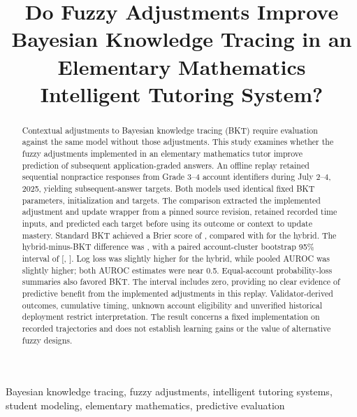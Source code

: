 \documentclass[conference]{IEEEtran}
\newif\ifworkingdraft
\newcommand{\draftnote}[1]{\ifworkingdraft\par\noindent\textcolor{red}{\textbf{Author review:} #1}\par\fi}
\begin{document}
\title{Do Fuzzy Adjustments Improve Bayesian Knowledge Tracing in an Elementary Mathematics Intelligent Tutoring System?}
\author{}
\maketitle
\draftnote{The approved offline comparison is complete and numerical results below are measured outputs. Before submission, complete the actual ethics reference, cohort/setting description and publication-overlap details; review the analysis and export the Mermaid figures.}

\begin{abstract}
Contextual adjustments to Bayesian knowledge tracing (BKT) require evaluation against the same model without those adjustments. This study examines whether the fuzzy adjustments implemented in an elementary mathematics tutor improve prediction of subsequent application-graded answers. An offline replay retained \CandidateResponseCount{} sequential nonpractice responses from \CandidateAccountCount{} Grade 3--4 account identifiers during July 2--4, 2025, yielding \ScoredTargets{} subsequent-answer targets. Both models used identical fixed BKT parameters, initialization and targets. The comparison extracted the implemented adjustment and update wrapper from a pinned source revision, retained recorded time inputs, and predicted each target before using its outcome or context to update mastery. Standard BKT achieved a Brier score of \BktBrier{}, compared with \HybridBrier{} for the hybrid. The hybrid-minus-BKT difference was \BrierDelta{}, with a paired account-cluster bootstrap 95\% interval of [\BrierCILower{}, \BrierCIUpper{}]. Log loss was slightly higher for the hybrid, while pooled AUROC was slightly higher; both AUROC estimates were near 0.5. Equal-account probability-loss summaries also favored BKT. The interval includes zero, providing no clear evidence of predictive benefit from the implemented adjustments in this replay. Validator-derived outcomes, cumulative timing, unknown account eligibility and unverified historical deployment restrict interpretation. The result concerns a fixed implementation on recorded trajectories and does not establish learning gains or the value of alternative fuzzy designs.
\end{abstract}
\begin{IEEEkeywords}
Bayesian knowledge tracing, fuzzy adjustments, intelligent tutoring systems, student modeling, elementary mathematics, predictive evaluation
\end{IEEEkeywords}
\end{document}
